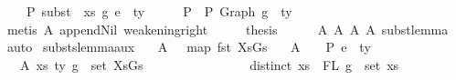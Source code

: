 \begin{isabellebody}
\ \ \ {\isachardoublequoteopen}{\isasymGamma}{}\ {\isasymturnstile}{\isacharbraceleft}{\kern0pt}P{\isacharbraceright}{\kern0pt}\ subst\ {}\ xs\ g\ e{}\ {\isacharcolon}{\kern0pt}\ ty{}{\isachardoublequoteclose}\isanewline
%
\isadelimproof
%
\endisadelimproof
%
\isatagproof
{}\isamarkupfalse%
\ {\isacharminus}{\kern0pt}\isanewline
\ \ \isamarkupfalse%
\ P{}{\isacharcolon}{\kern0pt}\ {\isachardoublequoteopen}{\isasymGamma}{}\ {\isasymturnstile}{\isacharbraceleft}{\kern0pt}P{\isacharbraceright}{\kern0pt}\ {\isacharparenleft}{\kern0pt}Graph\ g{\isacharparenright}{\kern0pt}\ {\isacharcolon}{\kern0pt}\ ty{\isachardoublequoteclose}\isanewline
\ \ \ \ \isamarkupfalse%
\ {\isacharparenleft}{\kern0pt}metis\ A{}\ append{\isacharunderscore}{\kern0pt}Nil\ weakening{\isacharunderscore}{\kern0pt}right{\isacharparenright}{\kern0pt}\isanewline
\ \ \isamarkupfalse%
\ \isamarkupfalse%
\ {\isacharquery}{\kern0pt}thesis\isanewline
\ \ \ \ \isamarkupfalse%
\ A{}\ A{}\ A{}\ A{}\ subst{\isacharunderscore}{\kern0pt}lemma\ \isamarkupfalse%
\ auto\isanewline
{}\isamarkupfalse%
%
\endisatagproof
{\isafoldproof}%
%
\isadelimproof
\isanewline
%
\endisadelimproof
\isanewline
\isanewline
{}\isamarkupfalse%
\ substs{\isacharunderscore}{\kern0pt}lemma{\isacharunderscore}{\kern0pt}aux{\isacharcolon}{\kern0pt}\isanewline
\ \ \ A{}{\isacharcolon}{\kern0pt}\ {\isachardoublequoteopen}{\isasymGamma}\ {\isacharequal}{\kern0pt}\ map\ fst\ XsGs{\isachardoublequoteclose}\isanewline
\ \ \ A{}{\isacharcolon}{\kern0pt}\ {\isachardoublequoteopen}{\isasymGamma}\ {\isacharat}{\kern0pt}\ {\isasymGamma}{}\ {\isasymturnstile}{\isacharbraceleft}{\kern0pt}P{\isacharbraceright}{\kern0pt}\ e{}\ {\isacharcolon}{\kern0pt}\ ty{}{\isachardoublequoteclose}\isanewline
\ \ \ A{}{\isacharcolon}{\kern0pt}\ {\isachardoublequoteopen}{\isasymforall}{\isacharparenleft}{\kern0pt}{\isacharparenleft}{\kern0pt}xs{\isacharcomma}{\kern0pt}\ ty{\isacharparenright}{\kern0pt}{\isacharcomma}{\kern0pt}\ g{\isacharparenright}{\kern0pt}\ {\isasymin}\ set\ XsGs{\isachardot}{\kern0pt}\ {\isacharparenleft}{\kern0pt}\isanewline
\ \ \ \ \ \ \ \ \ \ \ \ \ \ \ distinct\ xs\ {\isasymand}\ FL\ g\ {\isacharequal}{\kern0pt}\ set\ xs\ {\isasymand}\isanewline

\end{isabellebody}
